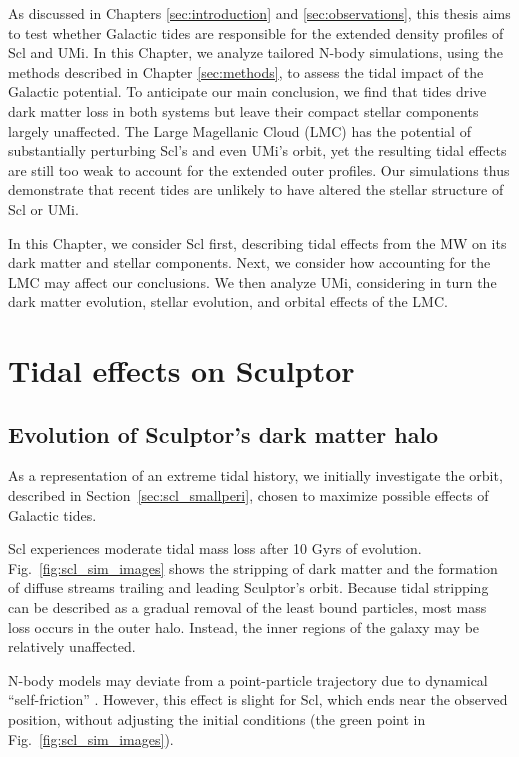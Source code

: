 As discussed in Chapters \ref{sec:introduction} and
\ref{sec:observations}, this thesis aims to test whether Galactic tides
are responsible for the extended density profiles of Scl and UMi. In
this Chapter, we analyze tailored N-body simulations, using the methods
described in Chapter \ref{sec:methods}, to assess the tidal impact of
the Galactic potential. To anticipate our main conclusion, we find that
tides drive dark matter loss in both systems but leave their compact
stellar components largely unaffected. The Large Magellanic Cloud (LMC)
has the potential of substantially perturbing Scl's and even UMi's
orbit, yet the resulting tidal effects are still too weak to account for
the extended outer profiles. Our simulations thus demonstrate that
recent tides are unlikely to have altered the stellar structure of Scl
or UMi.

In this Chapter, we consider Scl first, describing tidal effects from
the MW on its dark matter and stellar components. Next, we consider how
accounting for the LMC may affect our conclusions. We then analyze UMi,
considering in turn the dark matter evolution, stellar evolution, and
orbital effects of the LMC.

\section{Tidal effects on Sculptor}\label{tidal-effects-on-sculptor}

\subsection{Evolution of Sculptor's dark matter
halo}\label{evolution-of-sculptors-dark-matter-halo}

As a representation of an extreme tidal history, we initially
investigate the \smallperi{} orbit, described in
Section~\ref{sec:scl_smallperi}, chosen to maximize possible effects of
Galactic tides.

Scl experiences moderate tidal mass loss after 10 Gyrs of evolution.
Fig.~\ref{fig:scl_sim_images} shows the stripping of dark matter and the
formation of diffuse streams trailing and leading Sculptor's orbit.
Because tidal stripping can be described as a gradual removal of the
least bound particles, most mass loss occurs in the outer halo. Instead,
the inner regions of the galaxy may be relatively unaffected.

N-body models may deviate from a point-particle trajectory due to
dynamical ``self-friction'' \citep[e.g.,][]{white1983, miller+2020}.
However, this effect is slight for Scl, which ends near the observed
position, without adjusting the initial conditions (the green point in
Fig.~\ref{fig:scl_sim_images}).

